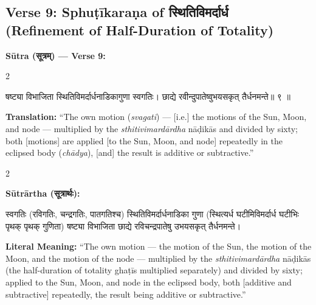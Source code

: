 \documentclass[11pt,a4paper]{article}
\newcommand{\dev}[1]{{\devanagarifont #1}}
\newenvironment{sanskritverse}{%
  \begin{center}\begin{minipage}{0.95\textwidth}
  \setlength{\leftskip}{1em}
  \setlength{\rightskip}{1em}
  \dev
}{\end{minipage}\end{center}}
\begin{document}
\subsection{Verse 9: Sphuṭīkaraṇa of \texorpdfstring{{\devanagarifont स्थितिविमर्दार्ध}}{sthitivimardārdha} (Refinement of Half-Duration of Totality)}

\vspace{0.5em}
\noindent\textbf{Sūtra (\dev{सूत्रम्}) — Verse 9:}

\begin{paracol}{2}

\begin{sanskritverse}
षष्ट्या विभाजिता स्थितिविमर्दार्धनाडिकागुणा स्वगतिः।
छाद्ये रवीन्दुपातेष्वुभयसकृत् तैर्धनमन्ते॥ ९ ॥
\end{sanskritverse}

\switchcolumn

\textbf{Translation:} ``The own motion (\textit{svagati}) --- [i.e.] the motions of the Sun, Moon, and node --- multiplied by the \textit{sthitivimardārdha} nāḍikās and divided by sixty; both [motions] are applied [to the Sun, Moon, and node] repeatedly in the eclipsed body (\textit{chādya}), [and] the result is additive or subtractive.''

\end{paracol}

\vspace{0.5em}

\begin{paracol}{2}

\noindent\textbf{Sūtrārtha (\dev{सूत्रार्थः}):}
\begin{sanskritverse}
स्वगतिः (रविगतिः, चन्द्रगतिः, पातगतिश्च) स्थितिविमर्दार्धनाडिका गुणा
(स्थित्यर्ध घटीमिविमर्दार्ध घटीभिः पृथक् पृथक् गुणिता) षष्ट्या विभाजिता छाद्ये
रविचन्द्रपातेषु उभयसकृत् तैर्धनमन्ते।
\end{sanskritverse}

\switchcolumn

\textbf{Literal Meaning:} ``The own motion --- the motion of the Sun, the motion of the Moon, and the motion of the node --- multiplied by the \textit{sthitivimardārdha} nāḍikās (the half-duration of totality ghaṭīs multiplied separately) and divided by sixty; applied to the Sun, Moon, and node in the eclipsed body, both [additive and subtractive] repeatedly, the result being additive or subtractive.''

\end{paracol}
\end{document}
